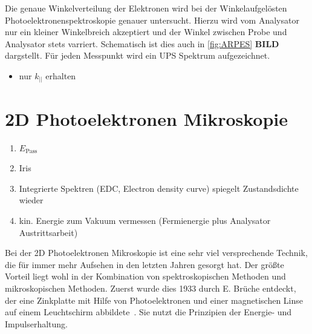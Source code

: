             Die genaue Winkelverteilung der Elektronen wird bei der Winkelaufgelösten Photoelektronenspektroskopie genauer untersucht.
            Hierzu wird vom Analysator nur ein kleiner Winkelbreich akzeptiert und der Winkel zwischen Probe und Analysator stets varriert.
            Schematisch ist dies auch in \autoref{fig:ARPES} \textbf{BILD} dargstellt.
            Für jeden Messpunkt wird ein UPS Spektrum aufgezeichnet.
            \begin{itemize}
                \item nur $k_{||}$ erhalten
            \end{itemize}


    \section{2D Photoelektronen Mikroskopie} \label{sec:2D-PES}
        \begin{enumerate}
            \item $E_\text{Pass}$
            \item Iris
            \item Integrierte Spektren (EDC, Electron density curve) spiegelt Zustandsdichte wieder
            \item kin. Energie zum Vakuum vermessen (Fermienergie plus Analysator Austrittsarbeit)
        \end{enumerate}
        Bei der 2D Photoelektronen Mikroskopie ist eine sehr viel versprechende Technik, die für immer mehr Aufsehen in den letzten Jahren gesorgt hat.
        Der größte Vorteil liegt wohl in der Kombination von spektroskopischen Methoden und mikroskopischen Methoden.
        Zuerst wurde dies 1933 durch E. Brüche entdeckt, der eine Zinkplatte mit Hilfe von Photoelektronen und einer magnetischen Linse auf einem Leuchtschirm abbildete~\cite{bruche_elektronenmikroskopische_1933}.
        Sie nutzt die Prinzipien der Energie- und Impulserhaltung.


